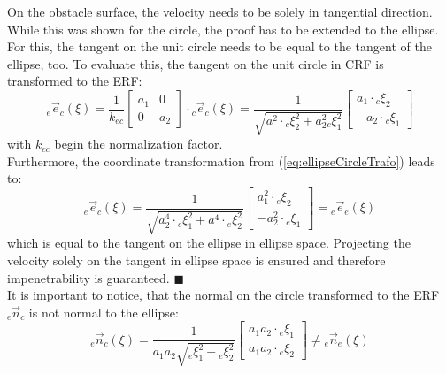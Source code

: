 On the obstacle surface, the velocity needs to be solely in tangential direction. While this was shown for the circle, the proof has to be extended to the ellipse. For this, the tangent on the unit circle needs to be equal to the tangent of the ellipse, too. To evaluate this, the tangent on the unit circle in CRF is transformed to the ERF:
\begin{equation}
  {}_e \vec{e}_{c} (\xi) = \frac{1}{k_{ec}}\begin{bmatrix} a_1 & 0 \\ 0 & a_2\end{bmatrix} \cdot {}_c \vec{e}_{c}(\xi)
    = \frac{1}{\sqrt{a^2 \cdot {}_c\xi_2^2 + a_2^2 {}_c\xi_1^2}}
  \begin{bmatrix}
       a_1 \cdot {}_c\xi_2 \\
     - a_2 \cdot {}_c\xi_1
   \end{bmatrix}
 \end{equation}
 with $k_{ec}$ begin the normalization factor. \\
Furthermore, the coordinate transformation from (\ref{eq:ellipseCircleTrafo}) leads to:
\begin{equation}
  {}_e \vec{e}_{c} (\xi) =
  \frac{1}{\sqrt{a_2^4 \cdot {}_e\xi_1^2 + a^4 \cdot{}_e \xi_2^2}}
  \begin{bmatrix}
    a_1^2 \cdot {}_e\xi_2 \\
    - a_2^2 \cdot {}_e\xi_1
  \end{bmatrix}
   =
    {}_e \vec{e}_{e} (\xi)
\end{equation}
which is equal to the tangent on the ellipse in ellipse space. Projecting the velocity solely on the tangent in ellipse space is ensured and therefore impenetrability is guaranteed. \hfill $\blacksquare$ \\

It is important to notice, that the normal on the circle transformed to the ERF ${}_e \vec n_{c} $ is not normal to the ellipse:
\begin{equation}
  {}_e\vec n_{c} (\xi)
  =
  \frac{1}{a_1 a_2\sqrt{ {}_e\xi_1^2 + {}_e \xi_2^2}}
  \begin{bmatrix}
     a_1 a_2 \cdot{}_e\xi_1 \\
     a_1 a_2 \cdot {}_e\xi_2
   \end{bmatrix}
  \neq
  {}_e\vec n_{e} (\xi)
\end{equation}


